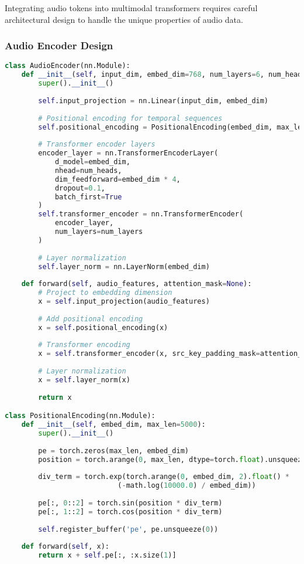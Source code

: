 Integrating audio tokens into multimodal transformers requires careful architectural design to handle the unique properties of audio data.

\subsubsection{Audio Encoder Design}

\begin{lstlisting}[language=Python, caption=Audio encoder for generating audio tokens]
class AudioEncoder(nn.Module):
    def __init__(self, input_dim, embed_dim=768, num_layers=6, num_heads=8):
        super().__init__()
        
        self.input_projection = nn.Linear(input_dim, embed_dim)
        
        # Positional encoding for temporal sequences
        self.positional_encoding = PositionalEncoding(embed_dim, max_len=2000)
        
        # Transformer encoder layers
        encoder_layer = nn.TransformerEncoderLayer(
            d_model=embed_dim,
            nhead=num_heads,
            dim_feedforward=embed_dim * 4,
            dropout=0.1,
            batch_first=True
        )
        self.transformer_encoder = nn.TransformerEncoder(
            encoder_layer, 
            num_layers=num_layers
        )
        
        # Layer normalization
        self.layer_norm = nn.LayerNorm(embed_dim)
        
    def forward(self, audio_features, attention_mask=None):
        # Project to embedding dimension
        x = self.input_projection(audio_features)
        
        # Add positional encoding
        x = self.positional_encoding(x)
        
        # Transformer encoding
        x = self.transformer_encoder(x, src_key_padding_mask=attention_mask)
        
        # Layer normalization
        x = self.layer_norm(x)
        
        return x

class PositionalEncoding(nn.Module):
    def __init__(self, embed_dim, max_len=5000):
        super().__init__()
        
        pe = torch.zeros(max_len, embed_dim)
        position = torch.arange(0, max_len, dtype=torch.float).unsqueeze(1)
        
        div_term = torch.exp(torch.arange(0, embed_dim, 2).float() * 
                           (-math.log(10000.0) / embed_dim))
        
        pe[:, 0::2] = torch.sin(position * div_term)
        pe[:, 1::2] = torch.cos(position * div_term)
        
        self.register_buffer('pe', pe.unsqueeze(0))
    
    def forward(self, x):
        return x + self.pe[:, :x.size(1)]
\end{lstlisting}

